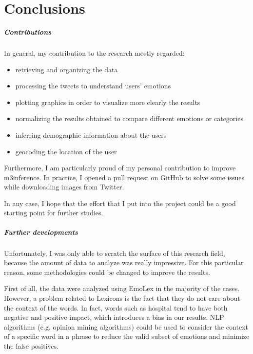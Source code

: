 

\chapter{Conclusions}
\label{cha:conclusions}

\paragraph{Contributions}

In general, my contribution to the research mostly regarded:

\begin{itemize}
	\item retrieving and organizing the data
	\item processing the tweets to understand users' emotions
	\item plotting graphics in order to visualize more clearly the results
	\item normalizing the results obtained to compare different emotions or categories
	\item inferring demographic information about the users
	\item geocoding the location of the user
\end{itemize}

Furthermore, I am particularly proud of my personal contribution to improve m3inference. In practice, I opened a pull request on GitHub to solve some issues while downloading images from Twitter.

In any case, I hope that the effort that I put into the project could be a good starting point for further studies.

\paragraph{Further developments}

Unfortunately, I was only able to scratch the surface of this research field, because the amount of data to analyze was really impressive. For this particular reason, some methodologies could be changed to improve the results.

First of all, the data were analyzed using EmoLex in the majority of the cases. However, a problem related to Lexicons is the fact that they do not care about the context of the words. In fact, words such as hospital tend to have both negative and positive impact, which introduces a bias in our results. NLP algorithms (e.g. opinion mining algorithms) could be used to consider the context of a specific word in a phrase to reduce the valid subset of emotions and minimize the false positives.

